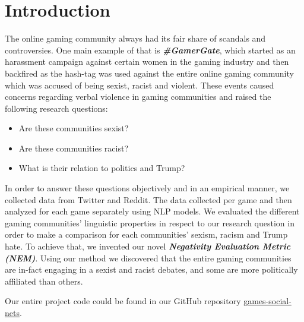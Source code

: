 \section{Introduction}
The online gaming community always had its fair share of scandals and controversies.
One main example of that is \textbf{\emph{\#GamerGate}}, which started as an harassment campaign against certain women in the gaming industry and then backfired as the hash-tag was used against the entire online gaming community which was accused of being sexist, racist and violent. These events caused concerns regarding verbal violence in gaming communities and raised the following  research questions:

\begin{itemize}
    \item Are these communities sexist?
    \item Are these communities racist?
    \item What is their relation to politics and Trump?
\end{itemize}  

In order to answer these questions objectively and in an empirical manner, we collected data from Twitter and Reddit. The data collected per game and then analyzed for each game separately using NLP models. We evaluated the different gaming communities' linguistic properties in respect to our research question in order to make a comparison for each communities' sexism, racism and Trump hate. To achieve that, we invented our novel \textbf{\emph{Negativity Evaluation Metric (NEM)}}. Using our method we discovered that the entire gaming communities are in-fact engaging in a sexist and racist debates, and some are more politically affiliated than others.

Our entire project code could be found in our GitHub repository \href{https://github.com/goldmyu/games-social-nets}{games-social-nets}.
